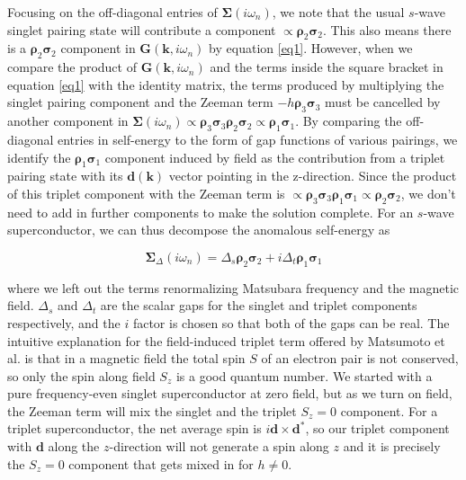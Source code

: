 \documentclass[a4paper,12pt]{article}
\begin{document}
\noindent Focusing on the off-diagonal entries of $\boldsymbol{\Sigma}(i\omega_{n})$, we note that the usual $s$-wave singlet pairing state will contribute a component $\propto \boldsymbol\rho_{2}\boldsymbol\sigma_{2}$\cite{SigristUeda}. This also means there is a $\boldsymbol\rho_{2}\boldsymbol\sigma_{2}$ component in $\textbf{G}(\textbf{k}, i\omega_{n})$ by equation \ref{eq1}. However, when we compare the product of $\textbf{G}(\textbf{k}, i\omega_{n})$ and the terms inside the square bracket in equation \ref{eq1} with the identity matrix, the terms produced by multiplying the singlet pairing component and the Zeeman term $-h\boldsymbol\rho_{3}\boldsymbol\sigma_{3}$ must be cancelled by another component in $\boldsymbol\Sigma(i\omega_{n})\propto\boldsymbol\rho_{3}\boldsymbol\sigma_{3}\boldsymbol\rho_{2}\boldsymbol\sigma_{2}\propto\boldsymbol\rho_{1}\boldsymbol\sigma_{1}$. By comparing the off-diagonal entries in self-energy to the form of gap functions of various pairings, we identify the $\boldsymbol\rho_{1}\boldsymbol\sigma_{1}$ component induced by field as the contribution from a triplet pairing state with its $\textbf{d}(\textbf{k})$ vector pointing in the z-direction\cite{SigristUeda}. Since the product of this triplet component with the Zeeman term is $\propto\boldsymbol\rho_{3}\boldsymbol\sigma_{3}\boldsymbol\rho_{1}\boldsymbol\sigma_{1}\propto\boldsymbol\rho_{2}\boldsymbol\sigma_{2}$, we don't need to add in further components to make the solution complete. For an $s$-wave superconductor, we can thus decompose the anomalous self-energy as

\begin{equation} \label{eq7}
    \boldsymbol{\Sigma}_{\Delta}(i\omega_{n})=\Delta_{s}\boldsymbol\rho_{2}\boldsymbol\sigma_{2}+i\Delta_{t}\boldsymbol\rho_{1}\boldsymbol\sigma_{1}
\end{equation}

\noindent where we left out the terms renormalizing Matsubara frequency and the magnetic field. $\Delta_{s}$ and $\Delta_{t}$ are the scalar gaps for the singlet and triplet components respectively, and the $i$ factor is chosen so that both of the gaps can be real. The intuitive explanation for the field-induced triplet term offered by Matsumoto et al. is that in a magnetic field the total spin $S$ of an electron pair is not conserved, so only the spin along field $S_{z}$ is a good quantum number. We started with a pure frequency-even singlet superconductor at zero field, but as we turn on field, the Zeeman term will mix the singlet and the triplet $S_{z}=0$ component. For a triplet superconductor, the net average spin is $i\textbf{d}\times\textbf{d}^{\ast}$\cite{SigristUeda}, so our triplet component with $\textbf{d}$ along the $z$-direction will not generate a spin along $z$ and it is precisely the $S_{z}=0$ component that gets mixed in for $h \neq 0$.
\end{document}
